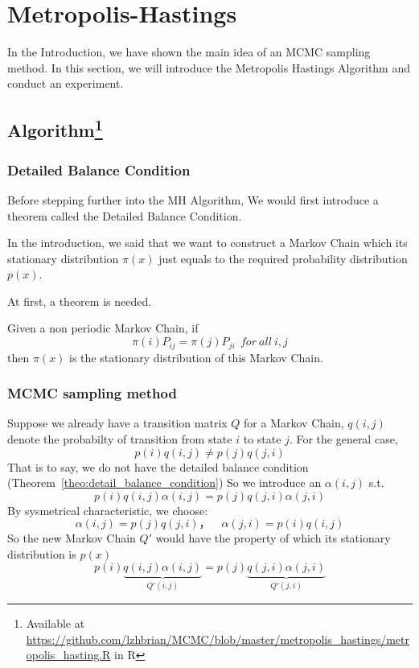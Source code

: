 
\section{Metropolis-Hastings} \label{sec:metropolis_hastings}
In the Introduction, we have shown the main idea of an MCMC sampling method. In this section, we will introduce the Metropolis Hastings Algorithm and conduct an experiment.



\subsection{Algorithm\protect\footnote{Available at \protect\url{https://github.com/lzhbrian/MCMC/blob/master/metropolis_hastings/metropolis_hasting.R} in R\cite{R}}}

\subsubsection{Detailed Balance Condition}
Before stepping further into the MH Algorithm, We would first introduce a theorem called the Detailed Balance Condition. 

In the introduction, we said that we want to construct a Markov Chain which its stationary distribution $\pi(x)$ just equals to the required probability distribution $p(x)$.

At first, a theorem is needed.
\begin{theorem} \label{theo:detail_balance_condition}
Given a non periodic Markov Chain, if 
\begin{equation} 
\pi(i) P_{ij} = \pi(j) P_{ji}~~for~all~i,j 
\end{equation}
then $\pi(x)$ is the stationary distribution of this Markov Chain.
\end{theorem}

\subsubsection{MCMC sampling method}
Suppose we already have a transition matrix $Q$ for a Markov Chain, $q(i,j)$ denote the probabilty of transition from state $i$ to state $j$. For the general case, 
$$p(i) q(i,j) \neq p(j) q(j,i)$$
That is to say, we do not have the detailed balance condition (Theorem~\ref{theo:detail_balance_condition})
So we introduce an $\alpha(i,j)$ s.t.
\begin{equation} 
p(i) q(i,j)\alpha(i,j) = p(j) q(j,i)\alpha(j,i) 
\end{equation}
By sysmetrical characteristic, we choose:
\begin{equation} 
\alpha(i,j)= p(j) q(j,i)， \quad \alpha(j,i) = p(i) q(i,j)
\end{equation}
So the new Markov Chain $Q'$ would have the property of which its stationary distribution is $p(x)$
\begin{equation}
\label{detailed-balance} 
p(i) \underbrace{q(i,j)\alpha(i,j)}_{Q'(i,j)} 
= p(j) \underbrace{q(j,i)\alpha(j,i)}_{Q'(j,i)}
\end{equation}

